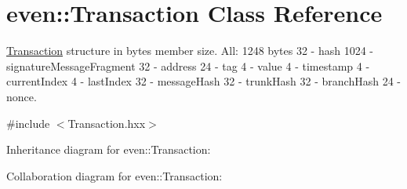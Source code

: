 \hypertarget{classeven_1_1_transaction}{}\section{even\+:\+:Transaction Class Reference}
\label{classeven_1_1_transaction}


\mbox{\hyperlink{classeven_1_1_transaction}{Transaction}} structure in bytes member size. All\+: 1248 bytes 32 -\/ hash 1024 -\/ signature\+Message\+Fragment 32 -\/ address 24 -\/ tag 4 -\/ value 4 -\/ timestamp 4 -\/ current\+Index 4 -\/ last\+Index 32 -\/ message\+Hash 32 -\/ trunk\+Hash 32 -\/ branch\+Hash 24 -\/ nonce.  




{\ttfamily \#include $<$Transaction.\+hxx$>$}



Inheritance diagram for even\+:\+:Transaction\+:


Collaboration diagram for even\+:\+:Transaction\+:
